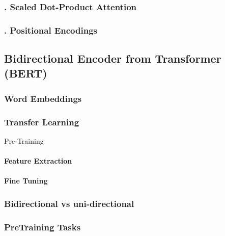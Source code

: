 \subsubsection{. Scaled Dot-Product Attention} 
\label{bg:subsub14}


\subsubsection{. Positional Encodings} 
\label{bg:subsub15}





\subsection{Bidirectional Encoder from Transformer (BERT)} 
\label{bg:sub11}

\subsubsection{Word Embeddings}

\subsubsection{Transfer Learning}
Pre-Training
\paragraph{Feature Extraction}
\paragraph{Fine Tuning}

\subsubsection{Bidirectional vs uni-directional}

\subsubsection{PreTraining Tasks}

